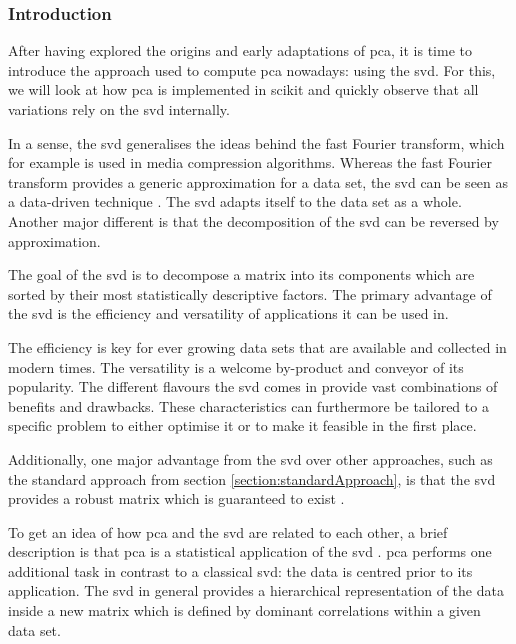 \subsubsection{Introduction}

After having explored the origins and early adaptations of \gls{pca}, it is time to introduce the approach used to compute \gls{pca} nowadays: using the \acrlong{svd}.
For this, we will look at how \gls{pca} is implemented in \gls{scikit} and quickly observe that all variations rely on the \gls{svd} internally.\bigskip


In a sense, the \gls{svd} generalises the ideas behind the fast Fourier transform, which for example is used in media compression algorithms. 
Whereas the fast Fourier transform provides a generic approximation for a data set, the \gls{svd} can be seen as a data-driven technique \cite{brunton2019data}.
The \gls{svd} adapts itself to the data set as a whole.
Another major different is that the decomposition of the \gls{svd} can be reversed by approximation.
\bigskip


The goal of the \gls{svd} is to decompose a matrix into its components which are sorted by their most statistically descriptive factors.
The primary advantage of the \gls{svd} is the efficiency and versatility of applications it can be used in.

The efficiency is key for ever growing data sets that are available and collected in modern times.
The versatility is a welcome by-product and conveyor of its popularity.
The different flavours the \gls{svd} comes in provide vast combinations of benefits and drawbacks.
These characteristics can furthermore be tailored to a specific problem to either optimise it or to make it feasible in the first place.

Additionally, one major advantage from the \gls{svd} over other approaches, such as the standard approach from section \ref{section:standardApproach}, is that the \gls{svd} provides a robust matrix which is guaranteed to exist \cite{brunton2019data}.\bigskip



To get an idea of how \gls{pca} and the \gls{svd} are related to each other, a brief description is that \gls{pca} is a statistical application of the \gls{svd} \cite{brunton2019data}.
\Gls{pca} performs one additional task in contrast to a classical \gls{svd}: the data is centred prior to its application.
The \gls{svd} in general provides a hierarchical representation of the data inside a new matrix which is defined by dominant correlations within a given data set.
\bigskip



